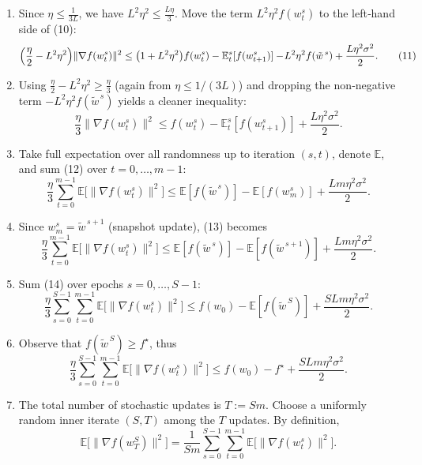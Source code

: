 \documentclass{article}
\begin{document}
\begin{enumerate}[label=[Step \arabic*], leftmargin=*]
\item Since $\eta\le\frac{1}{3L}$, we have $L^{2}\eta^{2}\le\frac{L\eta}{3}$.  Move the term $L^{2}\eta^{2}f(w_{t}^{s})$ to the left‑hand side of (10):
\[
\Bigl(\frac{\eta}{2}-L^{2}\eta^{2}\Bigr)\|\nabla f(w_{t}^{s})\|^{2}
\le
\bigl(1+L^{2}\eta^{2}\bigr)f(w_{t}^{s})- \mathbb{E}_{t}^{s}[f(w_{t+1}^{s})]
-\!L^{2}\eta^{2}f(\tilde w^{\,s})
+\frac{L\eta^{2}\sigma^{2}}{2}.
\tag{11}
\]

\item Using $\frac{\eta}{2}-L^{2}\eta^{2}\ge\frac{\eta}{3}$ (again from $\eta\le1/(3L)$) and dropping the non‑negative term $-L^{2}\eta^{2}f(\tilde w^{\,s})$ yields a cleaner inequality:
\[
\frac{\eta}{3}\|\nabla f(w_{t}^{s})\|^{2}
\le
f(w_{t}^{s})-\mathbb{E}_{t}^{s}[f(w_{t+1}^{s})]
+\frac{L\eta^{2}\sigma^{2}}{2}.
\tag{12}
\]

\item Take full expectation over all randomness up to iteration $(s,t)$, denote $\mathbb{E}$, and sum (12) over $t=0,\dots,m-1$:
\[
\frac{\eta}{3}\sum_{t=0}^{m-1}\mathbb{E}\!\bigl[\|\nabla f(w_{t}^{s})\|^{2}\bigr]
\le
\mathbb{E}[f(\tilde w^{\,s})]-\mathbb{E}[f(w_{m}^{s})]
+\frac{Lm\eta^{2}\sigma^{2}}{2}.
\tag{13}
\]

\item Since $w_{m}^{s}=\tilde w^{\,s+1}$ (snapshot update), (13) becomes
\[
\frac{\eta}{3}\sum_{t=0}^{m-1}\mathbb{E}\!\bigl[\|\nabla f(w_{t}^{s})\|^{2}\bigr]
\le
\mathbb{E}[f(\tilde w^{\,s})]-\mathbb{E}[f(\tilde w^{\,s+1})]
+\frac{Lm\eta^{2}\sigma^{2}}{2}.
\tag{14}
\]

\item Sum (14) over epochs $s=0,\dots,S-1$:
\[
\frac{\eta}{3}\sum_{s=0}^{S-1}\sum_{t=0}^{m-1}
\mathbb{E}\!\bigl[\|\nabla f(w_{t}^{s})\|^{2}\bigr]
\le
f(w_{0})- \mathbb{E}[f(\tilde w^{\,S})]
+\frac{SLm\eta^{2}\sigma^{2}}{2}.
\tag{15}
\]

\item Observe that $f(\tilde w^{\,S})\ge f^{\star}$, thus
\[
\frac{\eta}{3}\sum_{s=0}^{S-1}\sum_{t=0}^{m-1}
\mathbb{E}\!\bigl[\|\nabla f(w_{t}^{s})\|^{2}\bigr]
\le
f(w_{0})-f^{\star}
+\frac{SLm\eta^{2}\sigma^{2}}{2}.
\tag{16}
\]

\item The total number of stochastic updates is $T:=Sm$.  Choose a uniformly random inner iterate $(S,T)$ among the $T$ updates.  By definition,
\[
\mathbb{E}\!\bigl[\|\nabla f(w_{T}^{S})\|^{2}\bigr]
=
\frac{1}{Sm}\sum_{s=0}^{S-1}\sum_{t=0}^{m-1}
\mathbb{E}\!\bigl[\|\nabla f(w_{t}^{s})\|^{2}\bigr].
\tag{17}
\]


\end{enumerate}
\end{document}
